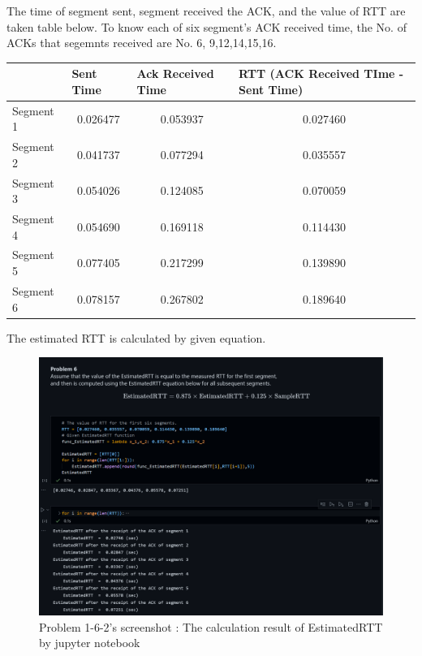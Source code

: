 \begin{enumerate}[label=\bfseries Problem \arabic*:,leftmargin=*,labelindent=1em]
        The time of segment sent, segment received the ACK, and the value of RTT are taken table below. To know each of six segment’s ACK received time, the No. of  ACKs that segemnts received are  No. 6, 9,12,14,15,16.
        \begin{table}[!h]\centering
        \hspace{10mm}
        \begin{tabular}{|l|c|c|c|}
        \hline
         & \multicolumn{1}{l|}{Sent Time} & \multicolumn{1}{l|}{Ack Received Time} & \multicolumn{1}{l|}{RTT (ACK Received TIme - Sent Time)} \\ \hline
        Segment 1 & 0.026477 & 0.053937 & 0.027460 \\ \hline
        Segment 2 & 0.041737 & 0.077294 & 0.035557 \\ \hline
        Segment 3 & 0.054026 & 0.124085 & 0.070059 \\ \hline
        Segment 4 & 0.054690 & 0.169118 & 0.114430 \\ \hline
        Segment 5 & 0.077405 & 0.217299 & 0.139890 \\ \hline
        Segment 6 & 0.078157 & 0.267802 & 0.189640 \\ \hline
        \end{tabular}
        \end{table}
\clearpage
        The estimated RTT is calculated by given equation.\\
        \vspace{-4mm}  
        \begin{figure}[!h]\raggedleft
        \hspace{15mm}
    		\includegraphics[width=.95\textwidth]{image/week02/1-6-3.png}
    		\caption{\footnotesize Problem 1-6-2's screenshot : The calculation result of EstimatedRTT by jupyter notebook}
    		\vspace{-10pt}
        \end{figure}
        

\end{enumerate}
